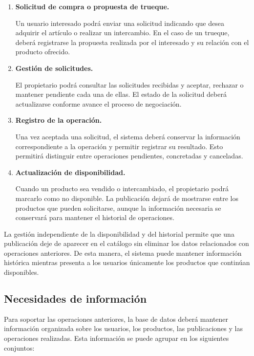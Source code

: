 \documentclass[12pt]{article} %
\begin{document}
\begin{enumerate}
    \item \textbf{Solicitud de compra o propuesta de trueque.}
    
    Un usuario interesado podrá enviar una solicitud indicando que desea adquirir el artículo o realizar un intercambio. En el caso de un trueque, deberá registrarse la propuesta realizada por el interesado y su relación con el producto ofrecido.

    \item \textbf{Gestión de solicitudes.}
    
    El propietario podrá consultar las solicitudes recibidas y aceptar, rechazar o mantener pendiente cada una de ellas. El estado de la solicitud deberá actualizarse conforme avance el proceso de negociación.

    \item \textbf{Registro de la operación.}
    
    Una vez aceptada una solicitud, el sistema deberá conservar la información correspondiente a la operación y permitir registrar su resultado. Esto permitirá distinguir entre operaciones pendientes, concretadas y canceladas.

    \item \textbf{Actualización de disponibilidad.}
    
    Cuando un producto sea vendido o intercambiado, el propietario podrá marcarlo como no disponible. La publicación dejará de mostrarse entre los productos que pueden solicitarse, aunque la información necesaria se conservará para mantener el historial de operaciones.
\end{enumerate}

La gestión independiente de la disponibilidad y del historial permite que una publicación deje de aparecer en el catálogo sin eliminar los datos relacionados con operaciones anteriores. De esta manera, el sistema puede mantener información histórica mientras presenta a los usuarios únicamente los productos que continúan disponibles.

\subsection{Necesidades de información}

Para soportar las operaciones anteriores, la base de datos deberá mantener información organizada sobre los usuarios, los productos, las publicaciones y las operaciones realizadas. Esta información se puede agrupar en los siguientes conjuntos:
\end{document}
